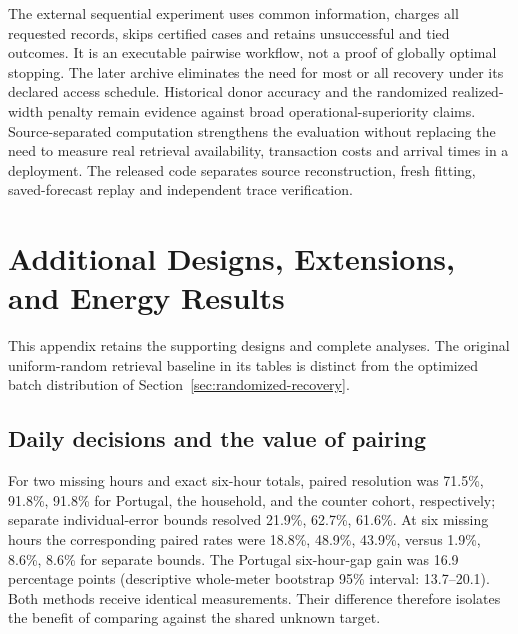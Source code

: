 \documentclass[12pt]{article}
\begin{document}
The external sequential experiment uses common information, charges all requested records, skips certified cases and retains unsuccessful and tied outcomes. It is an executable pairwise workflow, not a proof of globally optimal stopping. The later archive eliminates the need for most or all recovery under its declared access schedule. Historical donor accuracy and the randomized realized-width penalty remain evidence against broad operational-superiority claims. Source-separated computation strengthens the evaluation without replacing the need to measure real retrieval availability, transaction costs and arrival times in a deployment. The released code separates source reconstruction, fresh fitting, saved-forecast replay and independent trace verification.
\FloatBarrier
\appendix
\section{Additional Designs, Extensions, and Energy Results}\label{app:additional}
This appendix retains the supporting designs and complete analyses. The
original uniform-random retrieval baseline in its tables is distinct from
the optimized batch distribution of Section~\ref{sec:randomized-recovery}.
\subsection{Daily decisions and the value of pairing}\label{app:restricted-daily}
For two missing hours and exact six-hour totals, paired resolution was
71.5\%, 91.8\%, 91.8\% for Portugal, the household,
and the counter cohort, respectively; separate individual-error bounds
resolved 21.9\%, 62.7\%, 61.6\%. At six missing
hours the corresponding paired rates were 18.8\%, 48.9\%, 43.9\%,
versus 1.9\%, 8.6\%, 8.6\% for separate bounds.
The Portugal six-hour-gap gain was 16.9
percentage points (descriptive whole-meter bootstrap 95\% interval:
13.7--20.1).
Both methods receive identical measurements. Their difference therefore
isolates the benefit of comparing against the shared unknown target.
\end{document}
